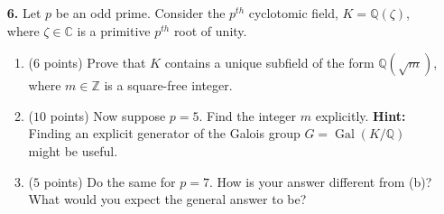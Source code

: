 \documentclass[12pt,
psamsfonts]{amsart}
\theoremstyle{remark}
\theoremstyle{definition}
\newcommand{\N}{\mathbb{N}\xspace}
\newcommand{\Z}{\mathbb{Z}\xspace}
\newcommand{\Q}{\mathbb{Q}\xspace}
\newcommand{\C}{\mathbb{C}\xspace}
\newcommand{\F}{\mathbb{F}\xspace}
\DeclareMathOperator{\Gal}{Gal}
\numberwithin{equation}{section}
\begin{document}
\begin{enumerate}
\item[\textbf{6.}] Let $p$ be an odd prime. Consider the $p^{th}$ cyclotomic field, $K=\Q(\zeta)$, where $\zeta\in\C$ is a primitive $p^{th}$ root of unity. 
\begin{enumerate}
\item ($6$ points) Prove that $K$ contains a unique subfield of the form $\Q(\sqrt{m})$, where $m\in\Z$ is a square-free integer.
\item ($10$ points) Now suppose $p=5$. Find the integer $m$ explicitly. \textbf{Hint:} Finding an explicit generator of the Galois group $G=\Gal(K/\Q)$  might be useful. 
\item ($5$ points) Do the same for $p=7$. How is your answer different from (b)? What would you expect the general answer to be? 
\end{enumerate}
\medskip 
\medskip
\medskip 
\medskip



\end{enumerate}
\end{document}
